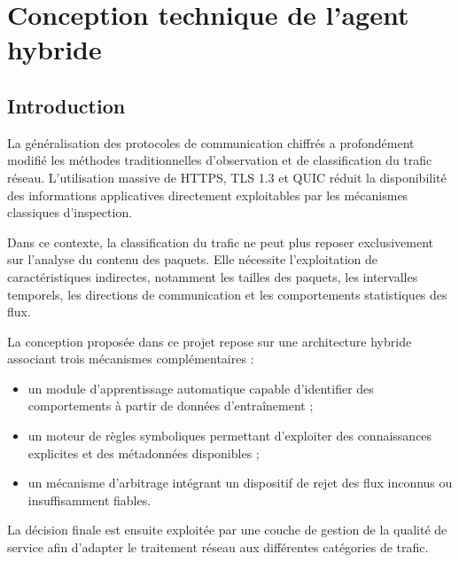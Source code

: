 

\chapter{Conception technique de l'agent hybride}
\label{chap:conception}

\section{Introduction}

La généralisation des protocoles de communication chiffrés
a profondément modifié les méthodes traditionnelles
d'observation et de classification du trafic réseau.
L'utilisation massive de HTTPS, TLS 1.3 et QUIC réduit
la disponibilité des informations applicatives directement
exploitables par les mécanismes classiques d'inspection.

Dans ce contexte, la classification du trafic ne peut plus
reposer exclusivement sur l'analyse du contenu des paquets.
Elle nécessite l'exploitation de caractéristiques indirectes,
notamment les tailles des paquets, les intervalles temporels,
les directions de communication et les comportements
statistiques des flux.

La conception proposée dans ce projet repose sur une
architecture hybride associant trois mécanismes
complémentaires :

\begin{itemize}
    \item un module d'apprentissage automatique capable
    d'identifier des comportements à partir de données
    d'entraînement ;
    \item un moteur de règles symboliques permettant
    d'exploiter des connaissances explicites et des
    métadonnées disponibles ;
    \item un mécanisme d'arbitrage intégrant un dispositif
    de rejet des flux inconnus ou insuffisamment fiables.
\end{itemize}

La décision finale est ensuite exploitée par une couche
de gestion de la qualité de service afin d'adapter
le traitement réseau aux différentes catégories de trafic.

